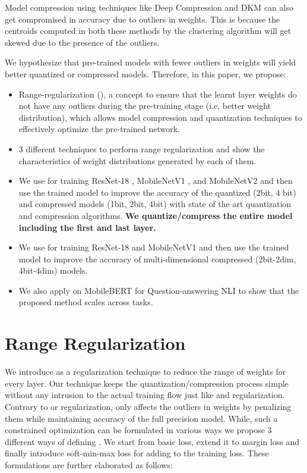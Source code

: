 \documentclass[10pt,twocolumn,letterpaper]{article}
\begin{document}
Model compression using techniques like Deep Compression \cite{HanMD15} and DKM \cite{cho2021dkm} can also get compromised in accuracy due to outliers in weights. This is because the centroids computed in both these methods by the clustering algorithm will get skewed due to the presence of the outliers. 

We hypothesize that pre-trained models with fewer outliers in weights will yield better quantized or compressed models. Therefore, in this paper, we propose:
\begin{itemize}
\item
{Range-regularization (), a concept to ensure that the learnt layer weights do not have any outliers during the pre-training stage (i.e, better weight distribution), which allows model compression and quantization techniques to effectively optimize the pre-trained network.}
\item
{3 different techniques to perform range regularization and show the characteristics of weight distributions generated by each of them}.
\item
{We use  for training ResNet-18 \cite{he2016deep}, MobileNetV1 \cite{howard2017mobilenets}, and MobileNetV2 \cite{sandler2018mobilenetv2} and then use the trained model to improve the accuracy of the quantized (2bit, 4 bit) and compressed models (1bit, 2bit, 4bit) with state of the art quantization and compression algorithms. \textbf{We quantize/compress the entire model including the first and last layer.}}
\item
{We use  for training ResNet-18 and MobileNetV1 and then use the trained model to improve the accuracy of multi-dimensional compressed (2bit-2dim, 4bit-4dim) models.}
\item
{We also apply  on MobileBERT \cite{sun2020mobilebert} for Question-answering NLI \cite{rajpurkar2016squad} to show that the proposed method scales across tasks.}
\end{itemize}






 \section{Range Regularization}
We introduce  as a regularization technique to reduce the range of weights for every layer. Our technique keeps the quantization/compression process simple without any intrusion to the actual training flow just like  and  regularization. Contrary to  or  regularization,  only affects the outliers in weights by penalizing them while maintaining accuracy of the full precision model. While, such a constrained optimization can be formulated in various ways we propose 3 different ways of defining . We start from basic  loss, extend it to margin loss and finally introduce soft-min-max loss for adding  to the training loss. These formulations are further elaborated as follows:
\end{document}
